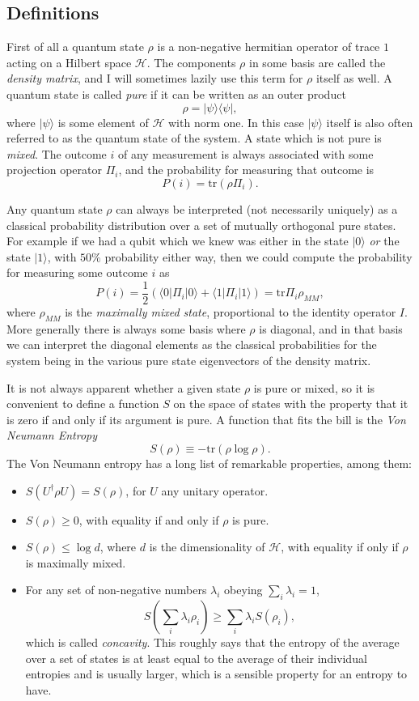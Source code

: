 \documentclass[12pt]{article}
\newcommand{\be}{\begin{equation}}
\newcommand{\ee}{\end{equation}}
\newcommand{\lan}{\langle}
\newcommand{\ran}{\rangle}
\begin{document}
\subsection{Definitions}
First of all a quantum state $\rho$ is a non-negative hermitian operator of trace $1$ acting on a Hilbert space $\mathcal{H}$.  The components $\rho$ in some basis are called the \textit{density matrix}, and I will sometimes lazily use this term for $\rho$ itself as well.  A quantum state is called \textit{pure} if it can be written as an outer product
\be
\rho=|\psi\ran\lan \psi|,
\ee 
where $|\psi\ran$ is some element of $\mathcal{H}$ with norm one.  In this case $|\psi\ran$ itself is also often referred to as the quantum state of the system.  A state which is not pure is \textit{mixed}.  The outcome $i$ of any measurement is always associated with some projection operator $\Pi_i$, and the probability for measuring that outcome is
\be
P(i)= \mathrm{tr} \left(\rho \Pi_i\right).
\ee

Any quantum state $\rho$ can always be interpreted (not necessarily uniquely) as a classical probability distribution over a set of mutually orthogonal pure states.  For example if we had a qubit which we knew was either in the state $|0\ran$ \textit{or} the state $|1\ran$, with $50\%$ probability either way, then we could compute the probability for measuring some outcome $i$ as
\be
P(i)=\frac{1}{2}\left(\lan 0 |\Pi_i |0\ran+\lan 1 |\Pi_i |1\ran\right)=\mathrm{tr} \Pi_i \rho_{MM},
\ee
where $\rho_{MM}$ is the \textit{maximally mixed state}, proportional to the identity operator $I$.  More generally there is always some basis where $\rho$ is diagonal, and in that basis we can interpret the diagonal elements as the classical probabilities for the system being in the various pure state eigenvectors of the density matrix.

It is not always apparent whether a given state $\rho$ is pure or mixed, so it is convenient to define a function $S$ on the space of states with the property that it is zero if and only if its argument is pure.  A function that fits the bill is the \textit{Von Neumann Entropy}
\be
S(\rho)\equiv -\mathrm{tr}\left(\rho \log \rho\right).  
\ee
The Von Neumann entropy has a long list of remarkable properties, among them:
\begin{itemize}
\item $S(U^\dagger \rho U)=S(\rho)$, for $U$ any unitary operator.
\item $S(\rho)\geq 0$, with equality if and only if $\rho$ is pure.
\item $S(\rho)\leq \log d$, where $d$ is the dimensionality of $\mathcal{H}$, with equality if only if $\rho$ is maximally mixed.
\item For any set of non-negative numbers $\lambda_i$ obeying $\sum_i\lambda_i=1$, 
\be
S\left(\sum_i \lambda_i \rho_i\right)\geq \sum_i \lambda_i S\left(\rho_i\right), 
\ee
which is called \textit{concavity}.  This roughly says that the entropy of the average over a set of states is at least equal to the average of their individual entropies and is usually larger, which is a sensible property for an entropy to have.  
\end{itemize}
\end{document}
